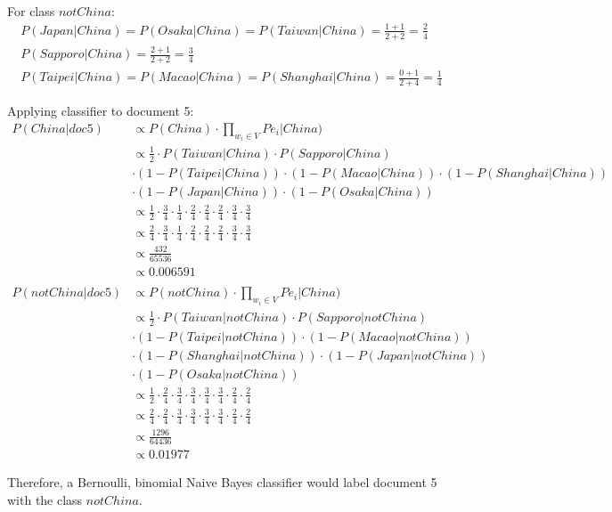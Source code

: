 \documentclass{article}
\begin{document}
For class $notChina$:
\begin{align}
P(Japan|China) = P(Osaka|China) = P(Taiwan|China) = \frac{1 + 1}{2 + 2} = \frac{2}{4} \\
P(Sapporo|China) = \frac{2 + 1}{2 + 2} = \frac{3}{4} \\
P(Taipei|China) = P(Macao|China) = P(Shanghai|China) = \frac{0 + 1}{2 + 4} = \frac{1}{4}
\end{align}

Applying classifier to document 5:
\begin{align}
	P(China|doc5) & \propto P(China) \cdot \prod_{w_i \in V} {Pe_i|China)} \\
	& \propto \frac{1}{2} \cdot P(Taiwan|China) \cdot P(Sapporo|China) \nonumber \\
	& \cdot (1 - P(Taipei|China)) \cdot (1 - P(Macao|China)) \cdot (1 - P(Shanghai|China)) \nonumber \\
	& \cdot (1 - P(Japan|China)) \cdot (1 - P(Osaka|China)) \\
	& \propto \frac{1}{2} \cdot \frac{3}{4} \cdot \frac{1}{4}
	\cdot \frac{2}{4} \cdot \frac{2}{4} \cdot \frac{2}{4}
	\cdot \frac{3}{4} \cdot \frac{3}{4} \\
	& \propto \frac{2}{4} \cdot \frac{3}{4} \cdot \frac{1}{4}
	\cdot \frac{2}{4} \cdot \frac{2}{4} \cdot \frac{2}{4}
	\cdot \frac{3}{4} \cdot \frac{3}{4} \\
	& \propto \frac{432}{65536} \\
	& \propto 0.006591 \\
	& \nonumber \\
	P(notChina|doc5) & \propto P(notChina) \cdot \prod_{w_i \in V} {Pe_i|China)} \\
	& \propto \frac{1}{2} \cdot P(Taiwan|notChina) \cdot P(Sapporo|notChina) \nonumber \\
	& \cdot (1 - P(Taipei|notChina)) \cdot (1 - P(Macao|notChina)) \nonumber \\
	& \cdot (1 - P(Shanghai|notChina)) \cdot (1 - P(Japan|notChina)) \nonumber \\
	& \cdot (1 - P(Osaka|notChina)) \\	
	& \propto \frac{1}{2} \cdot \frac{2}{4} \cdot \frac{3}{4} \cdot \frac{3}{4} \cdot \frac{3}{4} \cdot \frac{3}{4} \cdot \frac{2}{4} \cdot \frac{2}{4} \\
	& \propto \frac{2}{4} \cdot \frac{2}{4} \cdot \frac{3}{4} \cdot \frac{3}{4} \cdot \frac{3}{4} \cdot \frac{3}{4} \cdot \frac{2}{4} \cdot \frac{2}{4} \\
	& \propto \frac{1296}{64436} \\
	& \propto0.01977
\end{align}

Therefore, a Bernoulli, binomial Naive Bayes classifier would label document 5 with the class $notChina$.
\end{document}
